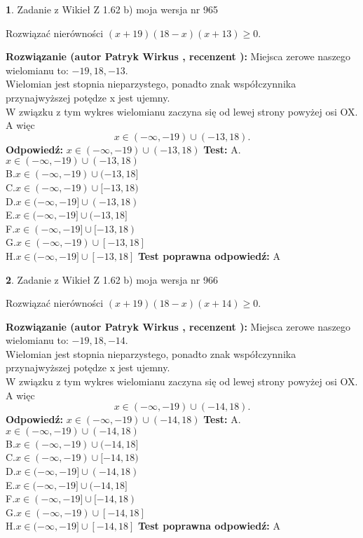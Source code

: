 \documentclass[12pt, a4paper]{article}
\theoremstyle{definition} %
\newtheorem{zad}{}
\newcommand{\zadStart}[1]{\begin{zad}#1\newline}
\newcommand{\zadStop}{\end{zad}}
\newcommand{\rozwStart}[2]{\noindent \textbf{Rozwiązanie (autor #1 , recenzent #2): }\newline}
\newcommand{\rozwStop}{\newline}
\newcommand{\odpStart}{\noindent \textbf{Odpowiedź:}\newline}
\newcommand{\odpStop}{\newline}
\newcommand{\testStart}{\noindent \textbf{Test:}\newline}
\newcommand{\testStop}{\newline}
\newcommand{\kluczStart}{\noindent \textbf{Test poprawna odpowiedź:}\newline}
\newcommand{\kluczStop}{\newline}
\begin{document}
\zadStart{Zadanie z Wikieł Z 1.62 b) moja wersja nr 965}

Rozwiązać nierówności $(x+19)(18-x)(x+13)\ge0$.
\zadStop
\rozwStart{Patryk Wirkus}{}
Miejsca zerowe naszego wielomianu to: $-19, 18, -13$.\\
Wielomian jest stopnia nieparzystego, ponadto znak współczynnika przy\linebreak najwyższej potędze x jest ujemny.\\ W związku z tym wykres wielomianu zaczyna się od lewej strony powyżej osi OX. A więc $$x \in (-\infty,-19) \cup (-13,18).$$
\rozwStop
\odpStart
$x \in (-\infty,-19) \cup (-13,18)$
\odpStop
\testStart
A.$x \in (-\infty,-19) \cup (-13,18)$\\
B.$x \in (-\infty,-19) \cup (-13,18]$\\
C.$x \in (-\infty,-19) \cup [-13,18)$\\
D.$x \in (-\infty,-19] \cup (-13,18)$\\
E.$x \in (-\infty,-19] \cup (-13,18]$\\
F.$x \in (-\infty,-19] \cup [-13,18)$\\
G.$x \in (-\infty,-19) \cup [-13,18]$\\
H.$x \in (-\infty,-19] \cup [-13,18]$
\testStop
\kluczStart
A
\kluczStop



\zadStart{Zadanie z Wikieł Z 1.62 b) moja wersja nr 966}

Rozwiązać nierówności $(x+19)(18-x)(x+14)\ge0$.
\zadStop
\rozwStart{Patryk Wirkus}{}
Miejsca zerowe naszego wielomianu to: $-19, 18, -14$.\\
Wielomian jest stopnia nieparzystego, ponadto znak współczynnika przy\linebreak najwyższej potędze x jest ujemny.\\ W związku z tym wykres wielomianu zaczyna się od lewej strony powyżej osi OX. A więc $$x \in (-\infty,-19) \cup (-14,18).$$
\rozwStop
\odpStart
$x \in (-\infty,-19) \cup (-14,18)$
\odpStop
\testStart
A.$x \in (-\infty,-19) \cup (-14,18)$\\
B.$x \in (-\infty,-19) \cup (-14,18]$\\
C.$x \in (-\infty,-19) \cup [-14,18)$\\
D.$x \in (-\infty,-19] \cup (-14,18)$\\
E.$x \in (-\infty,-19] \cup (-14,18]$\\
F.$x \in (-\infty,-19] \cup [-14,18)$\\
G.$x \in (-\infty,-19) \cup [-14,18]$\\
H.$x \in (-\infty,-19] \cup [-14,18]$
\testStop
\kluczStart
A
\kluczStop
\end{document}
